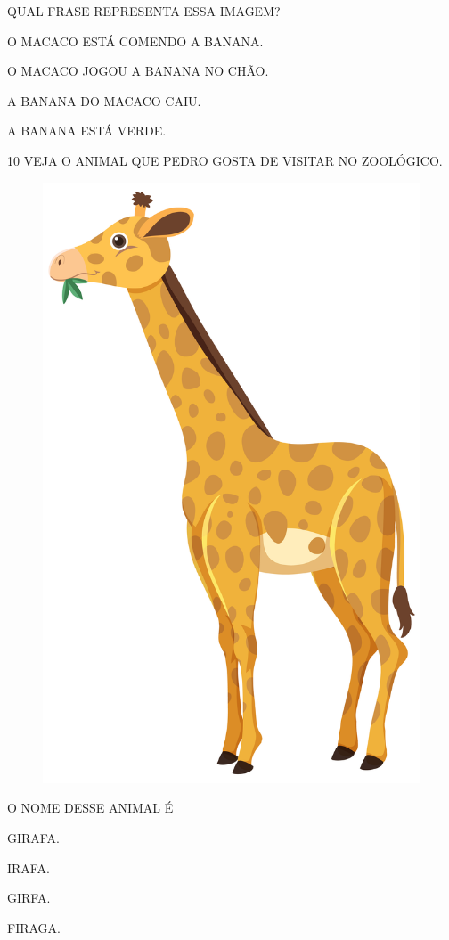 QUAL FRASE REPRESENTA ESSA IMAGEM?

\begin{escolha}
\item O MACACO ESTÁ COMENDO A BANANA.

\item O MACACO JOGOU A BANANA NO CHÃO.

\item A BANANA DO MACACO CAIU.

\item A BANANA ESTÁ VERDE.
\end{escolha}

\num{10} VEJA O ANIMAL QUE PEDRO GOSTA DE VISITAR NO ZOOLÓGICO.

\begin{minipage}{.5\textwidth}
\begin{figure}[H]
\centering
\includegraphics[width=.4\textwidth]{media/image219.jpg}
\end{figure}
\end{minipage}
\hspace{0.5cm}
\begin{minipage}{.5\textwidth}
O NOME DESSE ANIMAL É

\begin{escolha}
\item GIRAFA.

\item IRAFA.

\item GIRFA.

\item FIRAGA.
\end{escolha}
\end{minipage}

